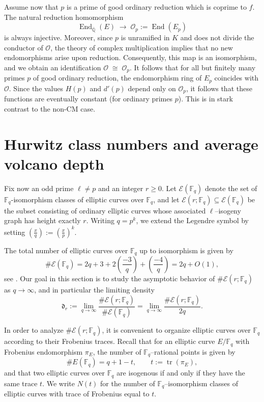 \documentclass[table]{amsart}
\newcommand{\Q}{\mathbb{Q}}
\newcommand{\F}{\mathbb{F}}
\newcommand{\cO}{\mathcal{O}}
\newcommand{\op}[1]{\operatorname{#1}}
\numberwithin{equation}{section}
\begin{document}
\par Assume now that $p$ is a prime of good ordinary reduction which is coprime to $f$. The natural reduction homomorphism
\[
\op{End}_{\overline{\Q}}(E)\;\rightarrow\;\cO_p := \op{End}(E_p)
\]
is always injective. Moreover, since $p$ is unramified in $K$ and does not divide the conductor of $\cO$, the theory of complex multiplication implies that no new endomorphisms arise upon reduction. Consequently, this map is an isomorphism, and we obtain an identification $\cO \;\cong\; \cO_p$. It follows that for all but finitely many primes $p$ of good ordinary reduction, the endomorphism ring of $E_p$ coincides with $\cO$. Since the values $H(p)$ and $d'(p)$ depend only on $\cO_p$, it follows that these functions are eventually constant (for ordinary primes $p$). This is in stark contrast to the non-CM case.

\section{Hurwitz class numbers and average volcano depth}\label{s4}

\par
Fix now an odd prime $\ell\neq p$ and an integer $r\ge 0$. Let $\mathcal{E}(\F_q)$ denote the set of $\F_q$-isomorphism classes of elliptic curves over $\F_q$, and let $\mathcal{E}(r;\F_q)\subseteq \mathcal{E}(\F_q)$ be the subset consisting of ordinary elliptic curves whose associated $\ell$–isogeny graph has height exactly $r$. Writing $q=p^k$, we extend the Legendre symbol by setting $\left(\frac{x}{q}\right):=\left(\frac{x}{p}\right)^k$.

\par
The total number of elliptic curves over $\F_q$ up to isomorphism is given by
\[
\#\mathcal{E}(\F_q)=2q+3+2\left(\frac{-3}{q}\right)+\left(\frac{-4}{q}\right)
=2q+O(1),
\]
see \cite[Proposition~5.7]{Schoof}. Our goal in this section is to study the asymptotic behavior of $\#\mathcal{E}(r;\F_q)$ as $q\to\infty$, and in particular the limiting density
\[
\mathfrak{d}_r
:=\lim_{q\to\infty}\frac{\#\mathcal{E}(r;\F_q)}{\#\mathcal{E}(\F_q)}
=\lim_{q\to\infty}\frac{\#\mathcal{E}(r;\F_q)}{2q}.
\]

\par
In order to analyze $\#\mathcal{E}(r;\F_q)$, it is convenient to organize elliptic curves over $\F_q$ according to their Frobenius traces. Recall that for an elliptic curve $E/\F_q$ with Frobenius endomorphism $\pi_E$, the number of $\F_q$–rational points is given by
\[
\#E(\F_q)=q+1-t,
\qquad t:=\operatorname{tr}(\pi_E),
\]
and that two elliptic curves over $\F_q$ are isogenous if and only if they have the same trace $t$. We write $N(t)$ for the number of $\F_q$–isomorphism classes of elliptic curves with trace of Frobenius equal to $t$.
\end{document}
